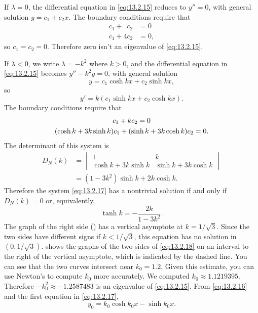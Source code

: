 \begin{solution}
If $\lambda=0$, the differential equation in \eqref{eq:13.2.15} reduces
to $y''=0$, with general solution $y=c_{1}+c_{2}x$. The boundary conditions
require that
\begin{align*}
c_{1}+\phantom{4}c_{2}&=0\\
c_{1}+4c_{2}&=0,
\end{align*}
so $c_{1}=c_{2}=0$. Therefore zero isn't  an eigenvalue of \eqref{eq:13.2.15}.

If $\lambda<0$,  we write
$\lambda=-k^{2}$ where $k>0$, and the differential equation in
\eqref{eq:13.2.15}   becomes $y''-k^{2}y=0$, with general solution
\begin{equation} \label{eq:13.2.16}
y=c_{1}\cosh kx+c_{2}\sinh kx,
\end{equation}
so
\[
y'=k(c_{1}\sinh kx+c_{2}\cosh kx).
\]
The boundary conditions require that
\begin{gather}
c_{1}+kc_{2}=0\notag\\
(\cosh k+3k\sinh k)c_{1}+(\sinh k+3k\cosh k)c_{2}=0.\label{eq:13.2.17}
\end{gather}
The determinant of this system is
\begin{align*}
D_{N}(k)&=
\begin{vmatrix}1&k\\\cosh k+3k\sinh k&\sinh k+3k \cosh k\end{vmatrix} \\
&= (1-3k^{2})\sinh k+2k \cosh k.
\end{align*}
Therefore the  system \eqref{eq:13.2.17} has a nontrivial solution if and only
if
$D_{N}(k)=0$ or, equivalently,
\begin{equation} \label{eq:13.2.18}
\tanh k=-\frac{2k}{1-3k^{2}}.
\end{equation}
The graph of the right side () has a vertical
asymptote at
$k=1/\sqrt{3}$.
Since the two sides have different signs if $k<1/\sqrt{3}$,  this equation
has no solution in $(0,1/\sqrt{3})$.  shows the
graphs
of the two sides of \eqref{eq:13.2.18} on an interval to the right of the
vertical asymptote, which is indicated by the dashed line. You can see that
the two curves intersect near $k_{0}=1.2$, Given this estimate, you can use
Newton's to compute $k_{0}$  more accurately. We computed $k_{0}\approx
1.1219395$. Therefore $-k_{0}^{2}\approx -1.2587483$ is an eigenvalue of
\eqref{eq:13.2.15}. From \eqref{eq:13.2.16} and the first equation in \eqref{eq:13.2.17},
\[
y_{0}=k_{0}\cosh k_{0}x-\sinh k_{0}x.
\]


\end{solution}
